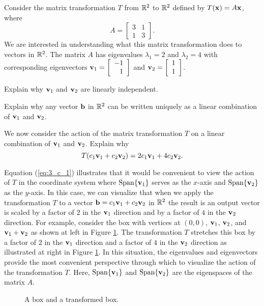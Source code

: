 \begin{pa} \label{pa:3_c_1} Consider the matrix transformation $T$ from $\mathbb{R}^2$ to $\mathbb{R}^2$ defined by $T(\mathbf{x}) = A \mathbf{x}$, where
\[A = \left[ \begin{array}{cc} 3&1\\1&3 \end{array} \right].\]
We are interested in understanding what this matrix transformation does to vectors in $\mathbb{R}^2$.  The matrix $A$ has eigenvalues $\lambda_1 = 2$ and $\lambda_2 = 4$ with corresponding eigenvectors $\mathbf{v}_1 = \left[ \begin{array}{r} -1\\1 \end{array} \right]$ and $\mathbf{v}_2 = \left[ \begin{array}{c} 1\\1 \end{array} \right]$. 

\be
\item Explain why $\mathbf{v}_1$ and $\mathbf{v}_2$ are linearly independent.


\item  Explain why any vector $\mathbf{b}$ in $\mathbb{R}^2$ can be written uniquely as a linear combination of $\mathbf{v}_1$ and $\mathbf{v}_2$. 

\item We now consider the action of the matrix transformation $T$ on a linear combination of $\mathbf{v}_1$ and $\mathbf{v}_2$. Explain why 
\begin{equation} \label{eq:3_c_1}
T(c_1\mathbf{v}_1 + c_2 \mathbf{v}_2) = 2c_1\mathbf{v}_1 + 4c_2 \mathbf{v}_2. 
\end{equation} 


\ee

\end{pa}

Equation (\ref{eq:3_c_1}) illustrates that it would be convenient to view the action of $T$ in the coordinate system where $\text{Span}\{\mathbf{v}_1\}$ serves as the $x$-axis and $\text{Span}\{\mathbf{v}_2\}$ as the $y$-axis. In this case, we can visualize that when we apply the transformation $T$ to a vector $\mathbf{b} = c_1 \mathbf{v}_1 + c_2 \mathbf{v}_2$ in $\mathbb{R}^2$ the result is an output vector is scaled by a factor of $2$ in the $\mathbf{v}_1$ direction and by a factor of $4$ in the $\mathbf{v}_2$ direction. For example, consider the box with vertices at $(0,0)$,  $\mathbf{v}_1$, $\mathbf{v}_2$, and $\mathbf{v}_1+\mathbf{v}_2$ as shown at left in Figure \ref{F:3_c_1}. The transformation $T$ stretches this box by a factor of $2$ in the $\mathbf{v}_1$ direction and a factor of $4$ in the $\mathbf{v}_2$ direction as illustrated at right in Figure \ref{F:3_c_1}. In this situation, the eigenvalues and eigenvectors provide the most convenient perspective through which to visualize the action of the transformation $T$. Here, $\text{Span}\{\mathbf{v}_1\}$ and $\text{Span}\{\mathbf{v}_2\}$ are the eigenspaces of the matrix $A$. 
\begin{figure}[ht]
\begin{center}
\end{center}
\caption{A box and a transformed box.}
\label{F:3_c_1}
\end{figure}

